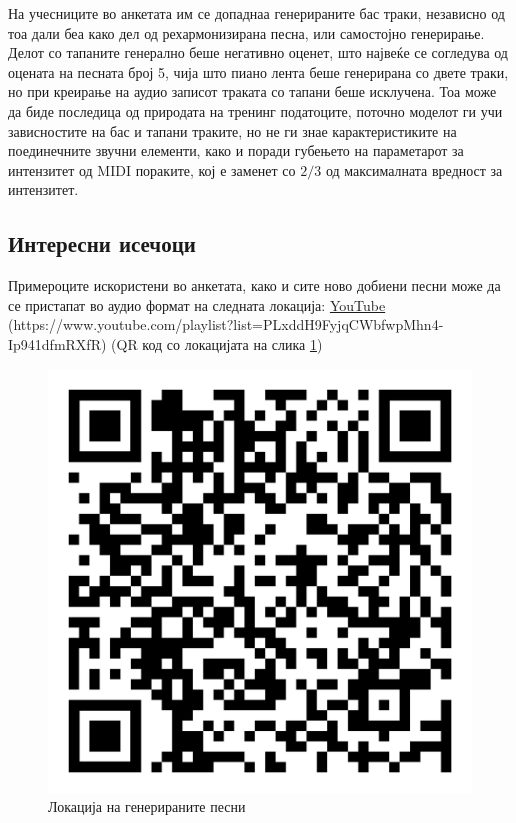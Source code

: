 На учесниците во анкетата им се допаднаа генерираните бас траки, независно од тоа дали беа како дел од рехармонизирана песна, или самостојно генерирање. Делот со тапаните генерално беше негативно оценет, што највеќе се согледува од оцената на песната број 5, чија што пиано лента беше генерирана со двете траки, но при креирање на аудио записот траката со тапани беше исклучена. Тоа може да биде последица од природата на тренинг податоците, поточно моделот ги учи зависностите на бас и тапани траките, но не ги знае карактеристиките на поединечните звучни елементи, како и поради губењето на параметарот за интензитет од MIDI пораките, кој е заменет со $2/3$ од максималната вредност за интензитет.

\newpage
\subsection{Интересни исечоци}

Примероците искористени во анкетата, како и сите ново добиени песни може да се пристапат во аудио формат на следната локација: \href{https://www.youtube.com/playlist?list=PLxddH9FyjqCWbfwpMhn4-Ip941dfmRXfR}{YouTube} (https://www.youtube.com/playlist?list=PLxddH9FyjqCWbfwpMhn4-Ip941dfmRXfR) (QR код со локацијата на слика \ref{fig:qr_code})

\begin{figure}[H]
	\centering
    \includegraphics[scale=0.18]{images/playlist_qr_code.png}
	\caption{Локација на генерираните песни}
	\label{fig:qr_code}
\end{figure}

